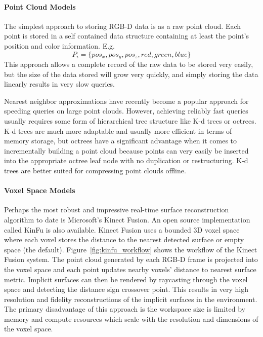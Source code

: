 \paragraph{Point Cloud Models}
The simplest approach to storing RGB-D data is as a raw point cloud. Each point is stored in a self contained data structure containing at least the point's position and color information. E.g. $$P_i=\{pos_x,pos_y,pos_z,red,green,blue\}$$ This approach allows a complete record of the raw data to be stored very easily, but the size of the data stored will grow very quickly, and simply storing the data linearly results in very slow queries.\par
Nearest neighbor approximations have recently become a popular approach for speeding queries on large point clouds\cite{muja2009fast}. However, achieving reliably fast queries usually requires some form of hierarchical tree structure like K-d trees\cite{nuchter:kdtree} or octrees\cite{octomap}. K-d trees are much more adaptable and usually more efficient in terms of memory storage, but octrees have a significant advantage when it comes to incrementally building a point cloud because points can very easily be inserted into the appropriate octree leaf node with no duplication or restructuring. K-d trees are better suited for compressing point clouds offline.
\paragraph{Voxel Space Models}
Perhaps the most robust and impressive real-time surface reconstruction algorithm to date is Microsoft's Kinect Fusion\cite{newcombe2011kinectfusion,izadi2011kinectfusion}. An open source implementation called KinFu is also available\cite{kinfu}. Kinect Fusion uses a bounded 3D voxel space where each voxel stores the distance to the nearest detected surface  or empty space (the default). Figure~\ref{fig:kinfu_workflow} shows the workflow of the Kinect Fusion system. The point cloud generated by each RGB-D frame is projected into the voxel space and each point updates nearby voxels' distance to nearest surface metric. Implicit surfaces can then be rendered by raycasting through the voxel space and detecting the distance sign crossover point. This results in very high resolution and fidelity reconstructions of the implicit surfaces in the environment. The primary disadvantage of this approach is the workspace size is limited by memory and compute resources which scale with the resolution and dimensions of the voxel space. \par

